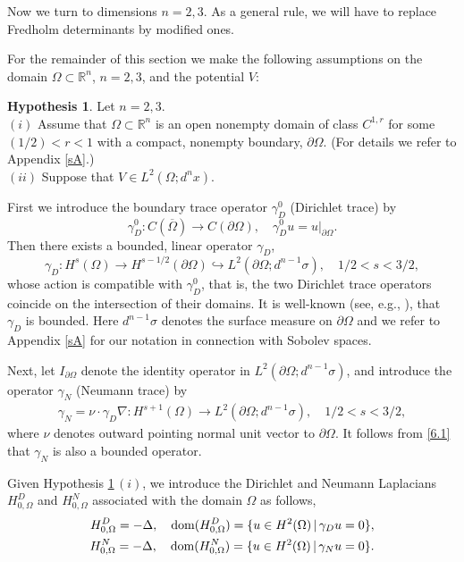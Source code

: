 \documentclass[reqno,10pt, centertags]{amsart}
\newcommand{\bbR}{{\mathbb{R}}}
\newcommand{\lb}{\label}
\newcommand{\ol}{\overline}
\newcommand{\ga}{\gamma}
\newcommand{\si}{\sigma}
\newcommand{\Om}{\Omega}
\newcommand{\dOm}{{\partial\Omega}}
\newcommand{\dom}{\text{\rm{dom}}}
\numberwithin{equation}{section}
\theoremstyle{definition}
\newtheorem{hypothesis}[theorem]{Hypothesis}
\begin{document}
Now we turn to dimensions $n=2,3$. As a general rule, we will have
to replace Fredholm determinants by modified ones.

For the remainder of this section we make the following assumptions on the
domain $\Omega\subset \bbR^n$, $n=2,3$, and the potential $V$:

\begin{hypothesis} \lb{h6.1} Let $n=2,3$. \\
$(i)$ Assume that $\Omega\subset{\bbR}^n$ is an open nonempty domain of
class $C^{1,r}$ for some $(1/2)<r<1$ with a compact, nonempty boundary,
$\partial\Omega$. (For details we refer to Appendix \ref{sA}.) \\
$(ii)$ Suppose that $V\in L^2(\Om;d^nx)$. \\
\end{hypothesis}

First we introduce the boundary trace operator $\ga_D^0$  (Dirichlet
trace) by
\begin{equation}
\ga_D^0\colon C(\ol{\Om})\to C(\dOm), \quad
\ga_D^0 u = u|_\dOm .
\end{equation}
Then there exists a bounded, linear operator $\gamma_D$,
\begin{equation}
\ga_D\colon H^{s}(\Om)\to H^{s-1/2}(\dOm) \hookrightarrow
L^2(\dOm;d^{n-1}\si), \quad 1/2<s<3/2,
\lb{6.1}
\end{equation}
whose action is compatible with $\ga_D^0$, that is, the two Dirichlet
trace  operators coincide on the intersection of their domains.
It is well-known (see, e.g., \cite[Theorem 3.38]{Mc00}), that $\ga_D$ is
bounded. Here $d^{n-1}\sigma$ denotes the surface measure
on $\dOm$ and we refer to Appendix \ref{sA} for our notation in connection
with Sobolev spaces.

Next, let $I_{\partial\Om}$ denote the identity operator in
$L^2(\partial\Om;d^{n-1}\sigma)$, and introduce the operator $\ga_N$
(Neumann trace) by
\begin{align}
\ga_N = \nu\cdot\ga_D\nabla \colon H^{s+1}(\Om)\to L^2(\dOm;d^{n-1}\si),
\quad 1/2<s<3/2, \lb{6.2}
\end{align}
where $\nu$ denotes outward pointing normal unit vector to $\partial\Om$.
It follows from \eqref{6.1} that $\ga_N$ is also a bounded operator.

Given Hypothesis \ref{h6.1}\,$(i)$, we introduce the Dirichlet and Neumann
Laplacians $H_{0,\Om}^D$ and $H_{0,\Om}^N$ associated with the domain
$\Om$ as follows,
\begin{align}
H^D_{0,\Om} = -\Delta, \quad \dom(H^D_{0,\Om}) = \{u\in H^{2}(\Om)
\,|\, \ga_D u = 0\}, \lb{6.3}
\\
H^N_{0,\Om} = -\Delta, \quad \dom(H^N_{0,\Om}) = \{u\in H^{2}(\Om)
\,|\, \ga_N u = 0\}. \lb{6.4}
\end{align}
\end{document}
